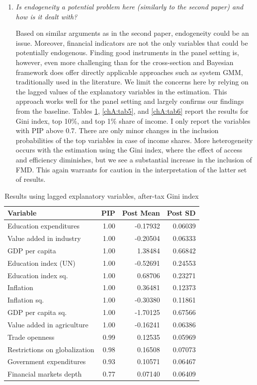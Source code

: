 \begin{enumerate}[resume]
    \item \textit{Is endogeneity a potential problem here (similarly to the second paper) and how is it dealt with?}
    
    Based on similar arguments as in the second paper, endogeneity could be an issue. Moreover, financial indicators are not the only variables that could be potentially endogenous. Finding good instruments in the panel setting is, however, even more challenging than for the cross-section and Bayesian framework does offer directly applicable approaches such as system GMM, traditionally used in the literature. We limit the concerns here by relying on the lagged values of the explanatory variables in the estimation. This approach works well for the panel setting and largely confirms our findings from the baseline. Tables \ref{chA:tab4}, \ref{chA:tab5}, and \ref{chA:tab6} report the results for Gini index, top 10\%, and top 1\% share of income. I only report the variables with \ac{PIP} above 0.7. There are only minor changes in the inclusion probabilities of the top variables in case of income shares. More heterogeneity occurs with the estimation using the Gini index, where the effect of access and efficiency diminishes, but we see a substantial increase in the inclusion of FMD. This again warrants for caution in the interpretation of the latter set of results.

\end{enumerate}

\begin{table}[ht!]    
  \caption{Results using lagged explanatory variables, after-tax Gini index}\label{chA:tab4}
  \centering
  \footnotesize
  \begin{tabular}{lrrr}
    \toprule
  Variable & PIP & Post Mean & Post SD \\
    \midrule
    Education expenditures & 1.00 & -0.17932 & 0.06039 \\
    Value added in industry & 1.00 & -0.20504 & 0.06333 \\ 
    GDP per capita & 1.00 & 1.38484 & 0.66842 \\
    Education index (UN) & 1.00 & -0.52691 & 0.24553 \\ 
    Education index sq. & 1.00 & 0.68706 & 0.23271 \\
    Inflation & 1.00 & 0.36481 & 0.12373 \\
    Inflation sq. & 1.00 & -0.30380 & 0.11861 \\ 
    GDP per capita sq. & 1.00 & -1.70125 & 0.67566 \\ 
    Value added in agriculture & 1.00 & -0.16241 & 0.06386 \\ 
    Trade openness & 0.99 & 0.12535 & 0.05969 \\
    Restrictions on globalization & 0.98 & 0.16508 & 0.07073 \\
    Government expenditures & 0.93 & 0.10571 & 0.06467 \\ 
    Financial markets depth & 0.77 & 0.07140 & 0.06409 \\ 
    \bottomrule
  \end{tabular}
  \end{table}

